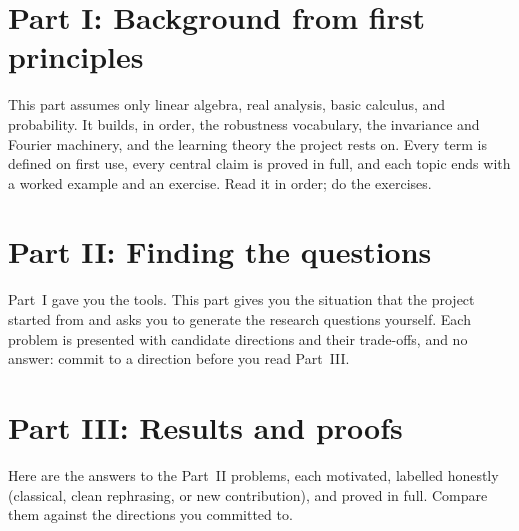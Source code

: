 \documentclass[11pt]{article}
\theoremstyle{plain}
\theoremstyle{definition}
\theoremstyle{remark}
\begin{document}
\part*{Part I: Background from first principles}
This part assumes only linear algebra, real analysis, basic calculus, and probability. It builds, in order, the
robustness vocabulary, the invariance and Fourier machinery, and the learning theory the project rests on. Every
term is defined on first use, every central claim is proved in full, and each topic ends with a worked example and
an exercise. Read it in order; do the exercises.





\part*{Part II: Finding the questions}
Part~I gave you the tools. This part gives you the situation that the project started from and asks you to generate
the research questions yourself. Each problem is presented with candidate directions and their trade-offs, and no
answer: commit to a direction before you read Part~III.



\part*{Part III: Results and proofs}
Here are the answers to the Part~II problems, each motivated, labelled honestly (classical, clean rephrasing, or new
contribution), and proved in full. Compare them against the directions you committed to.





\end{document}
